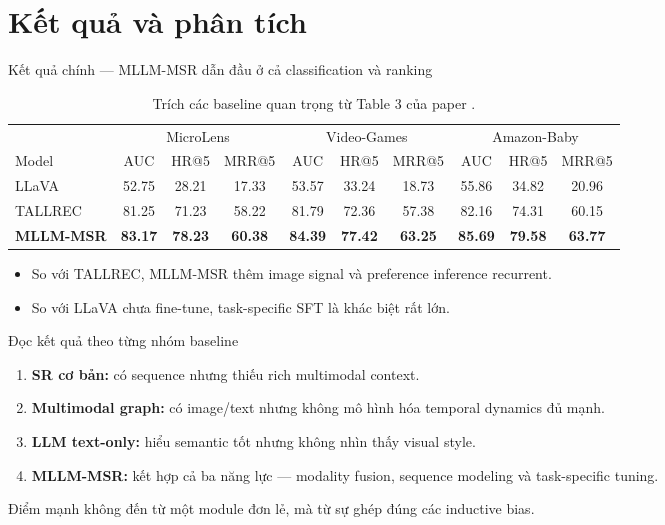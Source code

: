 \section{Kết quả và phân tích}
\begin{frame}{Kết quả chính — MLLM-MSR dẫn đầu ở cả classification và ranking}
  \begin{table}\centering\tiny
    \begin{tabular}{lccc|ccc|ccc}\toprule
      & \multicolumn{3}{c|}{MicroLens} & \multicolumn{3}{c|}{Video-Games} & \multicolumn{3}{c}{Amazon-Baby}\\
      Model & AUC & HR@5 & MRR@5 & AUC & HR@5 & MRR@5 & AUC & HR@5 & MRR@5\\\midrule
      LLaVA & 52.75 & 28.21 & 17.33 & 53.57 & 33.24 & 18.73 & 55.86 & 34.82 & 20.96\\
      TALLREC & 81.25 & 71.23 & 58.22 & 81.79 & 72.36 & 57.38 & 82.16 & 74.31 & 60.15\\
      \textbf{MLLM-MSR} & \textbf{83.17} & \textbf{78.23} & \textbf{60.38} & \textbf{84.39} & \textbf{77.42} & \textbf{63.25} & \textbf{85.69} & \textbf{79.58} & \textbf{63.77}\\\bottomrule
    \end{tabular}
    \caption{Trích các baseline quan trọng từ Table 3 của paper \cite{ye2025mllmmsr}.}
  \end{table}
  \vspace{0.15cm}\small
  \begin{itemize}
    \item So với TALLREC, MLLM-MSR thêm image signal và preference inference recurrent.
    \item So với LLaVA chưa fine-tune, task-specific SFT là khác biệt rất lớn.
  \end{itemize}
\end{frame}

\begin{frame}{Đọc kết quả theo từng nhóm baseline}
  \begin{enumerate}
    \item \textbf{SR cơ bản:} có sequence nhưng thiếu rich multimodal context.
    \item \textbf{Multimodal graph:} có image/text nhưng không mô hình hóa temporal dynamics đủ mạnh.
    \item \textbf{LLM text-only:} hiểu semantic tốt nhưng không nhìn thấy visual style.
    \item \textbf{MLLM-MSR:} kết hợp cả ba năng lực — modality fusion, sequence modeling và task-specific tuning.
  \end{enumerate}
  \vspace{0.25cm}\centering\large\textcolor{Logo1}{Điểm mạnh không đến từ một module đơn lẻ, mà từ sự ghép đúng các inductive bias.}
\end{frame}

